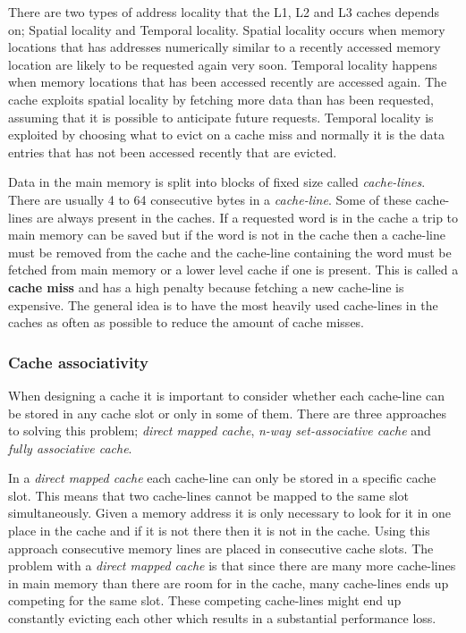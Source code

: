 There are two types of address locality that the L1, L2 and L3 caches depends on; Spatial locality and Temporal locality.
Spatial locality occurs when memory locations that has addresses numerically similar to a recently accessed memory location are likely to be requested again very soon.
Temporal locality happens when memory locations that has been accessed recently are accessed again.
The cache exploits spatial locality by fetching more data than has been requested, assuming that it is possible to anticipate future requests.
Temporal locality is exploited by choosing what to evict on a cache miss and normally it is the data entries that has not been accessed recently that are evicted.

Data in the main memory is split into blocks of fixed size called \textit{cache-lines}. 
There are usually 4 to 64 consecutive bytes in a \textit{cache-line}. 
Some of these cache-lines are always present in the caches. 
If a requested word is in the cache a trip to main memory can be saved but if the word is not in the cache then a cache-line must be removed from the cache and the cache-line containing the word must be fetched from main memory or a lower level cache if one is present. 
This is called a \textbf{cache miss} and has a high penalty because fetching a new cache-line is expensive.
The general idea is to have the most heavily used cache-lines in the caches as often as possible to reduce the amount of cache misses.

\subsubsection{Cache associativity}
When designing a cache it is important to consider whether each cache-line can be stored in any cache slot or only in some of them.
There are three approaches to solving this problem; \textit{direct mapped cache}, \textit{n-way set-associative cache} and \textit{fully associative cache}. 

In a \textit{direct mapped cache} each cache-line can only be stored in a specific cache slot.
This means that two cache-lines cannot be mapped to the same slot simultaneously.
Given a memory address it is only necessary to look for it in one place in the cache and if it is not there then it is not in the cache. Using this approach consecutive memory lines are placed in consecutive cache slots. 
The problem with a \textit{direct mapped cache} is that since there are many more cache-lines in main memory than there are room for in the cache, many cache-lines ends up competing for the same slot. 
These competing cache-lines might end up constantly evicting each other which results in a substantial performance loss.

